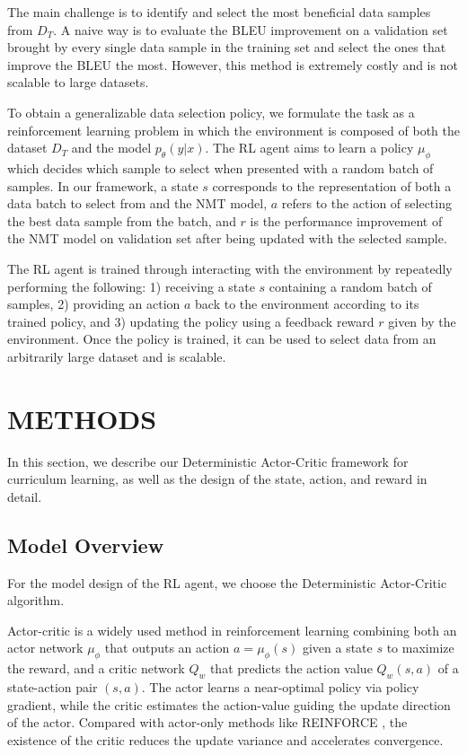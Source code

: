 \documentclass[letterpaper]{article}
\begin{document}
The main challenge is to identify and select the most beneficial data samples from $D_T$.
A naive way is to evaluate the BLEU improvement on a validation set brought by every single data sample in the training set and select the ones that improve the BLEU the most. However, this method is extremely costly and is not scalable to large datasets.

To obtain a generalizable data selection policy, we formulate the task as a reinforcement learning problem in which the environment is composed of both the dataset $D_T$ and the model $p_\theta(y|x)$. The RL agent aims to learn a policy $\mu_\phi$ which decides which sample to select when presented with a random batch of samples.
In our framework, a state $s$ corresponds to the representation of both a data batch to select from and the NMT model, $a$ refers to the action of selecting the best data sample from the batch, and $r$ is the performance improvement of the NMT model on validation set after being updated with the selected sample.

The RL agent is trained through interacting with the environment by repeatedly performing the following:
1) receiving a state $s$ containing a random batch of samples, 2) providing an action $a$ back to the environment according to its trained policy, and 3) updating the policy using a feedback reward $r$ given by the environment. Once the policy is trained, it can be used to select data from an arbitrarily large dataset and is scalable.


\section{METHODS}
\label{sec:model}

In this section, we describe our Deterministic Actor-Critic framework for curriculum learning, as well as the design of the state, action, and reward in detail.

\subsection{Model Overview}

For the model design of the RL agent, we choose the Deterministic Actor-Critic algorithm.

Actor-critic \cite{konda2000actor} is a widely used method in reinforcement learning combining both an actor network $\mu_\phi$ that outputs an action $a=\mu_\phi(s)$ given a state $s$ to maximize the reward, and a critic network $Q_w$ that predicts the action value $Q_w(s,a)$ of a state-action pair $(s,a)$. The actor learns a near-optimal policy via policy gradient, while the critic estimates the action-value guiding the update direction of the actor. Compared with actor-only methods like REINFORCE \cite{williams1992simple}, the existence of the critic reduces the update variance and accelerates convergence.
\end{document}
